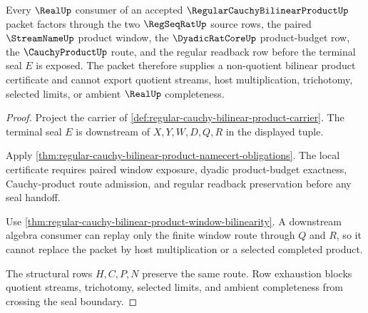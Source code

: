 \begin{theorem}
\label{thm:regular-cauchy-bilinear-product-real-seal-boundary}
Every $\RealUp$ consumer of an accepted $\RegularCauchyBilinearProductUp$ packet factors through the two $\RegSeqRatUp$ source rows, the paired $\StreamNameUp$ product window, the $\DyadicRatCoreUp$ product-budget row, the $\CauchyProductUp$ route, and the regular readback row before the terminal seal $E$ is exposed. The packet therefore supplies a non-quotient bilinear product certificate and cannot export quotient streams, host multiplication, trichotomy, selected limits, or ambient $\RealUp$ completeness.
\end{theorem}
\begin{proof}
Project the carrier of \autoref{def:regular-cauchy-bilinear-product-carrier}. The terminal seal $E$ is downstream of $X,Y,W,D,Q,R$ in the displayed tuple.

Apply \autoref{thm:regular-cauchy-bilinear-product-namecert-obligations}. The local certificate requires paired window exposure, dyadic product-budget exactness, Cauchy-product route admission, and regular readback preservation before any seal handoff.

Use \autoref{thm:regular-cauchy-bilinear-product-window-bilinearity}. A downstream algebra consumer can replay only the finite window route through $Q$ and $R$, so it cannot replace the packet by host multiplication or a selected completed product.

The structural rows $H,C,P,N$ preserve the same route. Row exhaustion blocks quotient streams, trichotomy, selected limits, and ambient completeness from crossing the seal boundary.
\end{proof}



